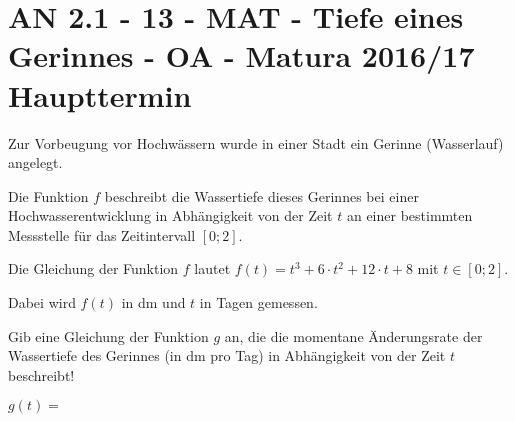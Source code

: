 \section{AN 2.1 - 13 - MAT - Tiefe eines Gerinnes - OA - Matura 2016/17 Haupttermin}

\begin{beispiel}[AN 2.1]{1} %
Zur Vorbeugung vor Hochwässern wurde in einer Stadt ein Gerinne (Wasserlauf) angelegt.

Die Funktion $f$ beschreibt die Wassertiefe dieses Gerinnes bei einer Hochwasserentwicklung in
Abhängigkeit von der Zeit $t$ an einer bestimmten Messstelle für das Zeitintervall $[0; 2]$.

Die Gleichung der Funktion $f$ lautet $f(t)=t^3+6\cdot t^2+12\cdot t +8$ mit $t\in [0; 2]$.

Dabei wird $f(t)$ in dm und $t$ in Tagen gemessen.

Gib eine Gleichung der Funktion $g$ an, die die momentane Änderungsrate der Wassertiefe
des Gerinnes (in dm pro Tag) in Abhängigkeit von der Zeit $t$ beschreibt! \leer

$g(t)=$  


\end{beispiel}